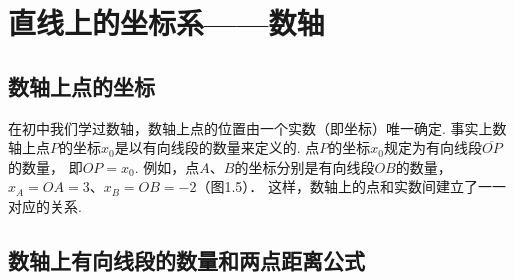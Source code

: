 \section{直线上的坐标系——数轴}
\subsection{数轴上点的坐标}
在初中我们学过数轴，数轴上点的位置由一个实数（即坐标）唯一确定. 事实上数轴上点$P$的坐标$x_0$是以有向线段的数量来定义的. 点$P$的坐标$x_0$规定为有向线段$\overline{OP}$的数量，
即$OP=x_0$. 例如，点$A$、$B$的坐标分别是有向线段$OB$的数量，$x_A=OA=3$、$x_B=OB=-2$（图1.5）．
这样，数轴上的点和实数间建立了一一对应的关系.
\begin{figure}[htp]
    \centering
{}
    \caption{}
\end{figure}

\subsection{数轴上有向线段的数量和两点距离公式}

